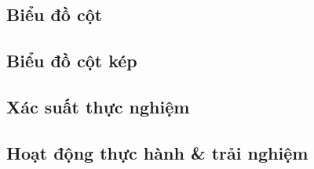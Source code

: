 \documentclass{article}
\numberwithin{equation}{section}
\begin{document}
\subsection{Biểu đồ cột}

\subsection{Biểu đồ cột kép}

\subsection{Xác suất thực nghiệm}

\subsection{Hoạt động thực hành \& trải nghiệm}




\printbibliography[heading=bibintoc]
	
\end{document}
